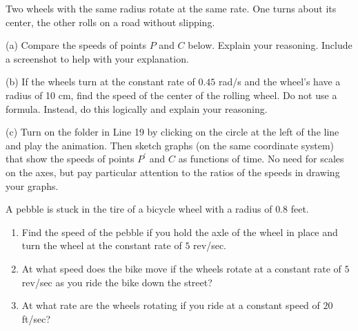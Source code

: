 \documentclass{ximera}
\begin{document}
\begin{exploration}\label{exp:angles2}
Two wheels with the same radius rotate at the same rate. One turns about its center, the other rolls on a road without slipping.

(a) Compare the speeds of points $P$ and $C$ below. Explain your reasoning. Include a screenshot to help with your explanation.

(b) If the wheels turn at the constant rate of $0.45$ rad/s and the wheel's have a radius of 10 cm, find the speed of the center of the rolling wheel. Do not use a  formula. Instead, do this logically and explain your reasoning. 

(c) Turn on the folder in Line 19 by clicking on the circle at the left of the line and play the animation. Then sketch graphs (on the same coordinate system) that show the speeds of points $P^\prime$ and $C$ as functions of time. No need for scales on the axes, but pay particular attention to the ratios of the speeds in drawing  your graphs.


 
\begin{onlineOnly}
    \begin{center}
\end{center}
\end{onlineOnly}
\end{exploration}

\begin{question} \label{Qdsfdsf4rt5yy55t}
A pebble is stuck in the tire of a bicycle wheel with a radius of $0.8$ feet. 
\begin{enumerate}
\item Find the speed of the pebble if you hold the axle of the wheel in place and turn the wheel at the constant rate of $5$ rev/sec.

\item At what speed does the bike move if the wheels rotate at a constant rate of $5$ rev/sec as you ride the bike down the street?

\item At what rate are the wheels rotating if you ride at a constant speed of $20$ ft/sec?

\end{enumerate}

\end{question}
\end{document}
